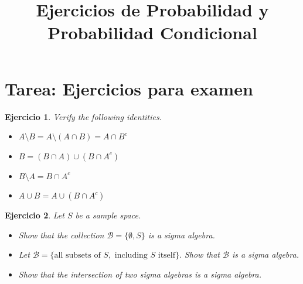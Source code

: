 \documentclass[12pt,twoside]{article}
\title{Ejercicios de Probabilidad y Probabilidad Condicional}
\author{}
\date{}
\newtheorem{Ejer}{Ejercicio}
\begin{document}
\maketitle
\tableofcontents
\section{Tarea: Ejercicios para examen}

\begin{Ejer} Verify the following identities.

\begin{itemize}
\item[(a)]  $A \setminus B = A \setminus (A \cap B) = A \cap B^{c}$

\item[(b)] $B = (B \cap A) \cup (B \cap A^{c})$

\item[(c)] $B \setminus A = B \cap A^{c}$

\item[(d)] $A \cup B = A \cup (B \cap A^{c})$

\end{itemize}
\end{Ejer}

\begin{Ejer} Let $S$ be a sample space.

\begin{itemize}

\item[(a)] Show that the collection  $\mathcal{B}=\{\emptyset,S\}$ is a sigma algebra.

\item[(b)] Let $\mathcal{B} = \{\text{all subsets of } S, \text{ including } S \text{ itself}\}.$ Show that $\mathcal{B}$ is a sigma algebra.

\item[(c)] Show that the intersection of two sigma algebras is a sigma algebra.

\end{itemize}
\end{Ejer}
\end{document}
